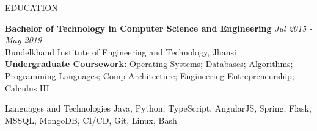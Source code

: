 \documentclass{resume} %
\begin{document}
\begin{rSection}{EDUCATION}

    {\bf Bachelor of Technology in Computer Science and Engineering} \hfill {\em Jul 2015 - May 2019} 
    \\ Bundelkhand Institute of Engineering and Technology, Jhansi
    \\ {\bf Undergraduate Coursework:} Operating Systems; Databases; Algorithms; Programming Languages; Comp Architecture; Engineering Entrepreneurship; Calculus III
    
    
    
    \end{rSection}

\begin{rSection}{Languages and Technologies}
Java, Python, TypeScript, AngularJS, Spring, Flask, MSSQL, MongoDB, CI/CD, Git, Linux, Bash \
\end{rSection}

\end{document}
